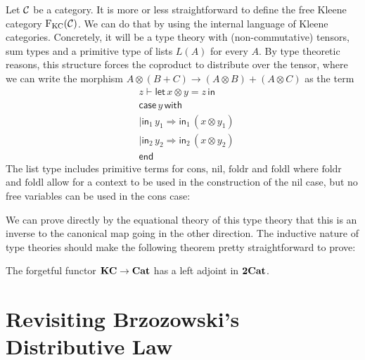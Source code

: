 \documentclass[acmsmall,anonymous,review,screen]{acmart}
\newcommand{\cat}[1]{
  \relax
  \StrLen{#1}[\arglength]
  \ifnum\arglength=1
  \mathcal{#1}
  \else
  \mathbf{#1}
  \fi
}
\newcommand{\FKC}{\textrm{F}_{\textrm{KC}}}
\begin{document}
Let $\cat{C}$ be a category. It is more or less straightforward to
define the free Kleene category $\FKC(\cat{C})$. We can do that by
using the internal language of Kleene categories. Concretely, it
will be a type theory with (non-commutative) tensors, sum types and
a primitive type of lists $L(A)$ for every $A$. By type theoretic reasons, this
structure forces the coproduct to distribute over the tensor, where we
can write the morphism $A \otimes (B + C) \to (A \otimes B) + (A
\otimes C) $ as the term
\begin{align*}
  &z \vdash \mathsf{let}\, x \otimes y = z\, \mathsf{in}\\
  &\mathsf{case}\, y \, \mathsf{with}\\
  &| \mathsf{in}_1\, y_1 \Rightarrow \mathsf{in}_1\, (x \otimes y_1)\\
  &| \mathsf{in}_2\,y_2\Rightarrow \mathsf{in}_2 \,(x \otimes y_2)\\
  &\mathsf{end}
\end{align*}
%
The list type includes primitive terms for $\textrm{cons}$,
$\textrm{nil}$, $\textrm{foldr}$ and $\textrm{foldl}$ where
$\textrm{foldr}$ and $\textrm{foldl}$ allow for a context to be used
in the construction of the nil case, but no free variables can be used
in the cons case:

We can prove directly by the equational theory of this type theory
that this is an inverse to the canonical map going in the other
direction. The inductive nature of type theories should make the
following theorem pretty straightforward to prove:
%
\begin{theorem}
  The forgetful functor $\cat{KC} \to \cat{Cat}$ has a left adjoint
  in $\cat{2Cat}$.
\end{theorem}

\section{Revisiting Brzozowski's Distributive Law}
\end{document}
